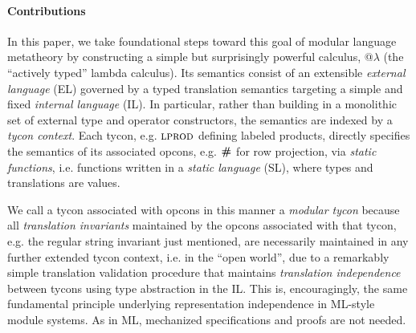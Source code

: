 \documentclass[pldi]{sigplanconf-pldi15}
\begin{document}
\paragraph{Contributions} In this paper, we take foundational steps toward this goal of modular language metatheory by  constructing a simple but surprisingly powerful  calculus, @$\lambda$ (the ``actively typed'' lambda calculus). %
Its semantics consist of an extensible \emph{external language} (EL) governed by a {typed translation semantics} targeting a simple and fixed \emph{internal language} (IL). 
In particular, rather than building in a monolithic set of external type and operator constructors, the  semantics are indexed by a \emph{tycon context}. Each tycon, e.g. $\textsc{lprod}$ defining labeled products, directly specifies the semantics of its associated opcons, e.g. $\textbf{\#}$ for row projection, via \emph{static functions}, i.e. functions written in a \emph{static language} (SL), where types and translations are values. %

We call a tycon associated with opcons in this manner a \emph{modular tycon} because all \emph{translation invariants} maintained by the opcons associated with that tycon, e.g. the regular string invariant just mentioned, are necessarily maintained in any further extended tycon context, i.e. in the ``open world'', due to a remarkably simple translation validation procedure that maintains \emph{translation independence} between tycons using type abstraction in the IL. This is, encouragingly, the same fundamental principle underlying representation independence in ML-style module systems. As in ML, mechanized specifications and proofs are not needed.%
\end{document}
